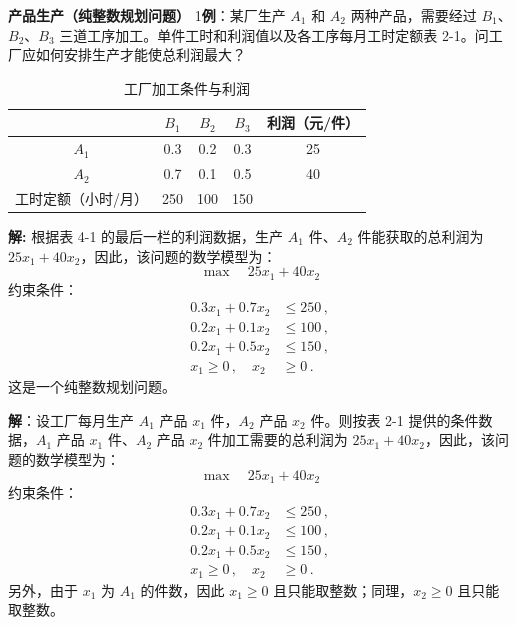 \begin{exbox}{\textbf{产品生产（纯整数规划问题）}}
    1\textbf{例}：某厂生产 $A_1$ 和 $A_2$ 两种产品，需要经过 $B_1$、$B_2$、$B_3$ 三道工序加工。单件工时和利润值以及各工序每月工时定额表 2-1。问工厂应如何安排生产才能使总利润最大？
    
    \begin{table}[H]
        \centering
        \label{tab:2-1}
        \renewcommand{\arraystretch}{1.5}
        \begin{tabular}{|c|c|c|c|c|}
            \hline
            & $B_1$ & $B_2$ & $B_3$ & 利润（元/件） \\ \hline
            $A_1$ & 0.3 & 0.2 & 0.3 & 25 \\ \hline
            $A_2$ & 0.7 & 0.1 & 0.5 & 40 \\ \hline
            工时定额（小时/月） & 250 & 100 & 150 & \\ \hline
        \end{tabular}
        \caption{工厂加工条件与利润}
    \end{table}
    
    \textbf{解:} 根据表 4-1 的最后一栏的利润数据，生产 $A_1$ 件、$A_2$ 件能获取的总利润为 $25x_1 + 40x_2$，因此，该问题的数学模型为：
    \begin{equation}
        \max \quad 25x_1 + 40x_2 \label{eq:Chapter4_obj_1}
    \end{equation}
    约束条件：
    \begin{align}
        0.3x_1 + 0.7x_2 &\leq 250 \,, \label{eq:c1} \\
        0.2x_1 + 0.1x_2 &\leq 100 \,, \label{eq:c2} \\
        0.2x_1 + 0.5x_2 &\leq 150 \,, \label{eq:c3} \\
        x_1 \geq 0 \,, \quad x_2 &\geq 0 \,. \label{eq:Chapter4_nonneg_1}
    \end{align}
    这是一个纯整数规划问题。
    
    \textbf{解}：设工厂每月生产 $A_1$ 产品 $x_1$ 件，$A_2$ 产品 $x_2$ 件。则按表 2-1 提供的条件数据，$A_1$ 产品 $x_1$ 件、$A_2$ 产品 $x_2$ 件加工需要的总利润为 $25x_1 + 40x_2$，因此，该问题的数学模型为：
    \begin{equation}
        \max \quad 25x_1 + 40x_2
    \end{equation}
    约束条件：
    \begin{align}
        0.3x_1 + 0.7x_2 &\leq 250 \,, \tag{$B_1$ 工序，工时限制} \\
        0.2x_1 + 0.1x_2 &\leq 100 \,, \tag{$B_2$ 工序，工时限制} \\
        0.2x_1 + 0.5x_2 &\leq 150 \,, \tag{$B_3$ 工序，工时限制} \\
        x_1 \geq 0 \,, \quad x_2 &\geq 0 \,. \tag{且只能整数}
    \end{align}
    另外，由于 $x_1$ 为 $A_1$ 的件数，因此 $x_1 \geq 0$ 且只能取整数；同理，$x_2 \geq 0$ 且只能取整数。
\end{exbox}


